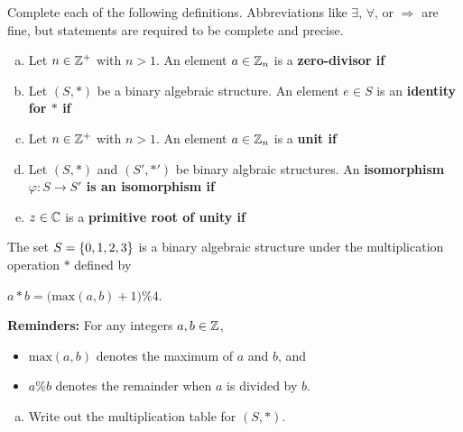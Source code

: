 \documentclass[11pt]{exam}
\begin{document}
\addpoints

\noindent
\begin{center}
\gradetable[v][pages]  %
\end{center}


\newpage %

%
%
%

\begin{questions}
\question[10] Complete each of the following definitions.  Abbreviations like $\exists$, $\forall$, or $\Rightarrow$ are fine, but statements are required to be complete and precise.
\begin{enumerate}[(a)]
\item Let $n\in\mathbb{Z}^{+}$ with $n > 1$.  An element $a\in \mathbb{Z}_{n}$ is a \bf zero-divisor \md if
\vfill

\item Let $(S,*)$ be a binary algebraic structure.  An element $e\in S$ is an \bf identity \md for $*$ if
\vfill

\item Let $n\in\mathbb{Z}^{+}$ with $n > 1$.  An element $a\in \mathbb{Z}_{n}$ is a \bf unit \md if
\vfill

\item Let $(S,*)$ and $(S',*')$ be binary algbraic structures.  An \bf isomorphism \md $\varphi:S\to S'$ is an isomorphism if
\vfill

\item $z\in\mathbb{C}$ is a \bf primitive root of unity \md if
\vfill

\end{enumerate}
\newpage


\question[5] The set $S = \left\{0,1,2,3\right\}$ is a binary algebraic structure under the multiplication operation $*$ defined by
\begin{center}
$a*b = \big(\text{max}(a,b) + 1\big)\% 4$.
\end{center}
\textbf{Reminders:} For any integers $a,b\in\mathbb{Z}$,
\begin{itemize}
	\item $\text{max}(a,b)$ denotes the maximum of $a$ and $b$, and
	\item $a\% b$ denotes the remainder when $a$ is divided by $b$.
\end{itemize}
\begin{enumerate}[(a)]
\item Write out the multiplication table for $(S,*)$.
\vspace{8cm}


\end{enumerate}
\end{questions}
\end{document}
